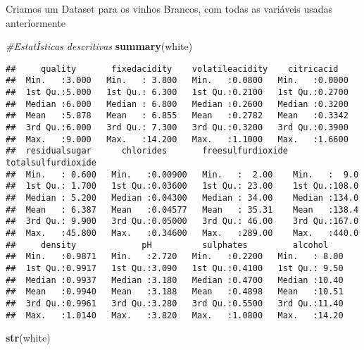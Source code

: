 \documentclass[]{article}
\newenvironment{Shaded}{\begin{snugshade}}{\end{snugshade}}
\newcommand{\KeywordTok}[1]{\textcolor[rgb]{0.13,0.29,0.53}{\textbf{#1}}}
\newcommand{\CommentTok}[1]{\textcolor[rgb]{0.56,0.35,0.01}{\textit{#1}}}
\newcommand{\NormalTok}[1]{#1}
\begin{document}
Criamos um Dataset para os vinhos Brancos, com todas as variáveis usadas
anteriormente

\begin{Shaded}
\begin{Highlighting}[]
\CommentTok{#EstatÌsticas descritivas}
\KeywordTok{summary}\NormalTok{(white)}
\end{Highlighting}
\end{Shaded}

\begin{verbatim}
##     quality       fixedacidity    volatileacidity    citricacid    
##  Min.   :3.000   Min.   : 3.800   Min.   :0.0800   Min.   :0.0000  
##  1st Qu.:5.000   1st Qu.: 6.300   1st Qu.:0.2100   1st Qu.:0.2700  
##  Median :6.000   Median : 6.800   Median :0.2600   Median :0.3200  
##  Mean   :5.878   Mean   : 6.855   Mean   :0.2782   Mean   :0.3342  
##  3rd Qu.:6.000   3rd Qu.: 7.300   3rd Qu.:0.3200   3rd Qu.:0.3900  
##  Max.   :9.000   Max.   :14.200   Max.   :1.1000   Max.   :1.6600  
##  residualsugar      chlorides       freesulfurdioxide totalsulfurdioxide
##  Min.   : 0.600   Min.   :0.00900   Min.   :  2.00    Min.   :  9.0     
##  1st Qu.: 1.700   1st Qu.:0.03600   1st Qu.: 23.00    1st Qu.:108.0     
##  Median : 5.200   Median :0.04300   Median : 34.00    Median :134.0     
##  Mean   : 6.387   Mean   :0.04577   Mean   : 35.31    Mean   :138.4     
##  3rd Qu.: 9.900   3rd Qu.:0.05000   3rd Qu.: 46.00    3rd Qu.:167.0     
##  Max.   :45.800   Max.   :0.34600   Max.   :289.00    Max.   :440.0     
##     density             pH          sulphates         alcohol     
##  Min.   :0.9871   Min.   :2.720   Min.   :0.2200   Min.   : 8.00  
##  1st Qu.:0.9917   1st Qu.:3.090   1st Qu.:0.4100   1st Qu.: 9.50  
##  Median :0.9937   Median :3.180   Median :0.4700   Median :10.40  
##  Mean   :0.9940   Mean   :3.188   Mean   :0.4898   Mean   :10.51  
##  3rd Qu.:0.9961   3rd Qu.:3.280   3rd Qu.:0.5500   3rd Qu.:11.40  
##  Max.   :1.0140   Max.   :3.820   Max.   :1.0800   Max.   :14.20
\end{verbatim}

\begin{Shaded}
\begin{Highlighting}[]
\KeywordTok{str}\NormalTok{(white)}
\end{Highlighting}
\end{Shaded}
\end{document}
